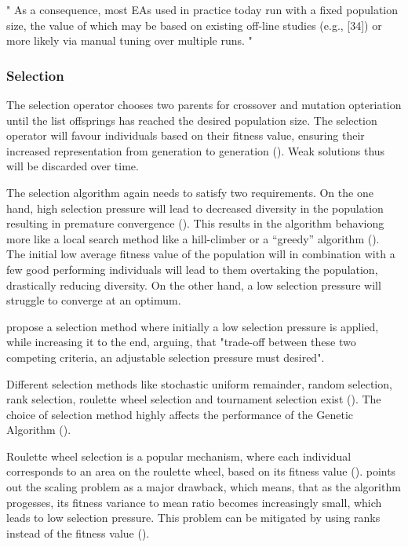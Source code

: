 "
As a consequence, most EAs used in practice today run with a fixed population size, the value of which may be based on existing off-line studies (e.g., [34]) or more likely via manual tuning over multiple runs.
"\cite{kacprzyk_parameter_2007}

\subsubsection{Selection}
The selection operator chooses two parents for crossover and mutation opteriation until the list offsprings has reached the desired population size. 
The selection operator will favour individuals based on their fitness value, ensuring their increased representation from generation to generation (\cite{srinivas_genetic_1994}). Weak solutions thus will be discarded over time.

The selection algorithm again needs to satisfy two requirements. On the one hand, high selection pressure will lead to decreased diversity in the population resulting in premature convergence (\cite{katoch_review_2021}). This results in the algorithm behaviong more like a local search method like a hill-climber or a “greedy” algorithm (\cite{kacprzyk_parameter_2007}).
The initial low average fitness value of the population will in combination with a few good performing individuals will lead to them overtaking the population, drastically reducing diversity.
On the other hand, a low selection pressure will struggle to converge at an optimum.

\cite{hussain_trade-off_2020} propose a selection method where initially a low selection pressure is applied, while increasing it to the end, arguing, that "trade-off between these two competing criteria, an adjustable selection pressure must desired".

Different selection methods like stochastic uniform remainder, random selection, rank selection, roulette wheel selection and tournament selection exist (\cite{majumdar_genetic_2015}). The choice of selection method highly affects the performance of the Genetic Algorithm (\cite{hussain_trade-off_2020}).

Roulette wheel selection is a popular mechanism, where each individual corresponds to an area on the roulette wheel, based on its fitness value (). \cite{grefenstette_optimization_1986} points out the scaling problem as a major drawback, which means, that as the algorithm progesses, its fitness variance to mean ratio becomes increasingly small, which leads to low selection pressure.
This problem can be mitigated by using ranks instead of the fitness value (\cite{katoch_review_2021}).

